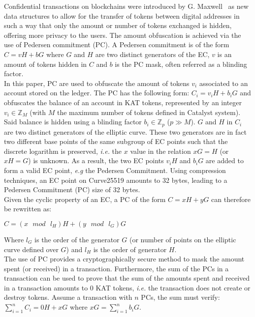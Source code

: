 Confidential transactions on blockchains were introduced by G. Maxwell~\cite{confidential} as new data structures to allow for the transfer of tokens between digital addresses in such a way that only the amount or number of tokens exchanged is hidden, offering more privacy to the users. The amount obfuscation is achieved via the use of Pedersen commitment (PC). A Pedersen commitment is of the form  $C = vH + bG$ where $G$ and $H$ are two distinct generators of the EC, $v$ is an amount of tokens hidden in $C$ and $b$ is the PC mask, often referred as a blinding factor.\\

In this paper, PC are used to obfuscate the amount of tokens $v_{i}$ associated to an account stored on the ledger. The PC has the following form: $C_{i} = v_{i}H + b_{i}G$ and obfuscates the balance of an account in KAT tokens, represented by an integer $v_{i} \in \mathbb{Z}_M$ (with $M$ the maximum number of tokens defined in Catalyst system). Said balance is hidden using a blinding factor $b_{i} \in  \mathbb{Z}_p$ ($p \gg M$). $G$ and $H$ in $C_{i}$ are two distinct generators of the elliptic curve. These two generators are in fact two different base points of the same subgroup of EC points such that the discrete logarithm is preserved, \textit{i.e.} the $x$ value in the relation $xG = H$ (or $xH = G$) is unknown. As a result, the two EC points $v_{i}H$ and $b_{i}G$ are added to form a valid EC point, \textit{e.g} the Pedersen Commitment. Using compression techniques, an EC point on Curve25519 amounts to 32 bytes, leading to a Pedersen Commitment (PC) size of 32 bytes.\\

Given the cyclic property of an EC, a PC of the form $C = xH + yG$ can therefore be rewritten as:
\begin{center}
$C = (x \text{ $mod$ } l_H) H + (y \text{ $mod$ } l_G) G$
\end{center}
Where $l_G$ is the order of the generator $G$ (or number of points on the elliptic curve defined over $G$) and $l_H$ is the order of generator $H$.\\ 


The use of PC provides a cryptographically secure method to mask the amount spent (or received) in a transaction. Furthermore, the sum of the PCs in a transaction can be used to prove that the sum of the amounts spent and received in a transaction amounts to 0 KAT tokens, \textit{i.e.} the transaction does not create or destroy tokens. Assume a transaction with $n$ PCs, the sum must verify: $\sum_{i=1}^n C_i = 0H + xG$ where $xG = \sum_{i=1}^n b_iG$.  \\

